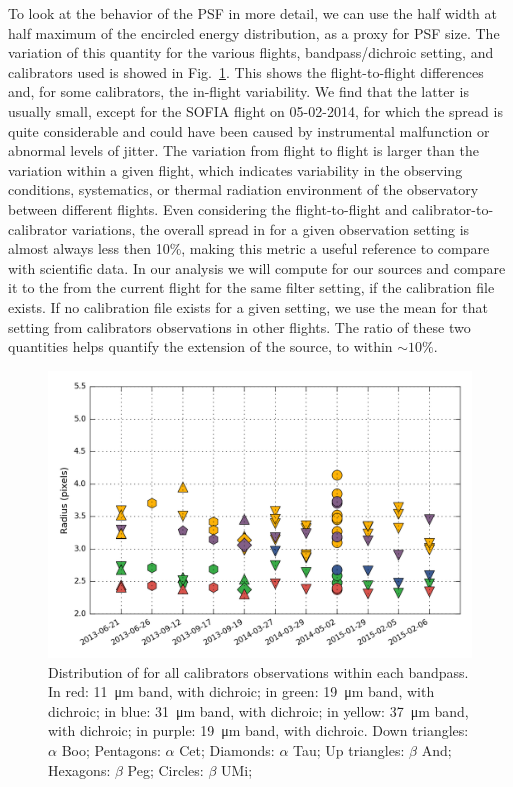 To look at the behavior of the PSF in more detail, we can use the half width at half maximum of the encircled energy distribution, \Rfifty as a proxy for PSF size. The variation of this quantity for the various flights, bandpass/dichroic setting, and calibrators used is showed in Fig.~\ref{fig:Rfiftydist}. This shows the flight-to-flight differences and, for some calibrators, the in-flight variability. We find that the latter is usually small, except for the SOFIA flight on 05-02-2014, for which the spread is quite considerable and could have been caused by instrumental malfunction or abnormal levels of jitter. The variation from flight to flight is larger than the variation within a given flight, which indicates variability in the observing conditions, systematics, or thermal radiation environment of the observatory between different flights. Even considering the flight-to-flight and calibrator-to-calibrator variations, the overall spread in \Rfifty for a given observation setting is almost always less then 10\%, making this metric a useful reference to compare with scientific data. In our analysis we will compute \Rfifty for our sources and compare it to the \Rfifty from the current flight for the same filter setting, if the calibration file exists. If no calibration file exists for a given setting, we use the mean \Rfifty for that setting from calibrators observations in other flights. The ratio \Rpercent of these two quantities helps quantify the extension of the source, to within $\sim 10\%$. 

\begin{figure}[!h]
\begin{center}
\includegraphics[width=\textwidth]{Figures/R50.png}
\vspace{-0.5cm}

\caption[PSF size of calibrators]{Distribution of \Rfifty for all calibrators observations within each bandpass. In red: \SI{11}{\um} band, with dichroic; in green: \SI{19}{\um} band, with dichroic; in blue: \SI{31}{\um} band, with dichroic; in yellow: \SI{37}{\um} band, with dichroic; in purple: \SI{19}{\um} band, with dichroic. Down triangles: $\alpha$ Boo; Pentagons: $\alpha$ Cet; Diamonds: $\alpha$ Tau;  Up triangles: $\beta$ And; Hexagons: $\beta$ Peg; Circles: $\beta$ UMi;}
\label{fig:Rfiftydist}
\end{center}
\end{figure}

